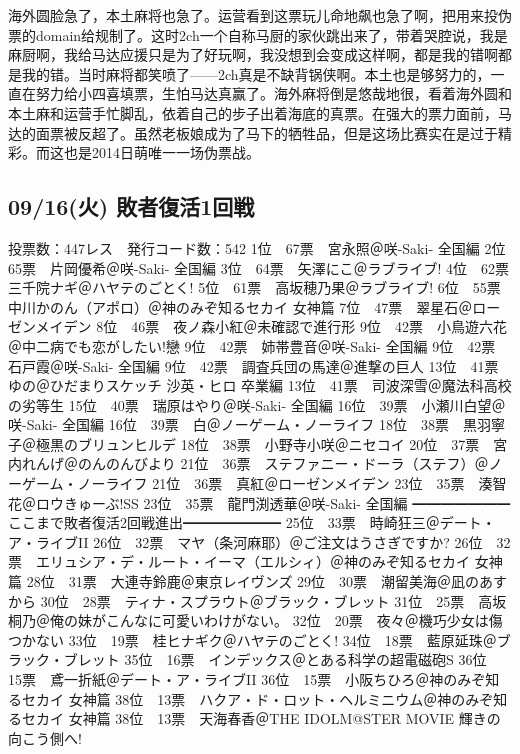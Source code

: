 海外圆脸急了，本土麻将也急了。运营看到这票玩儿命地飙也急了啊，把用来投伪票的domain给规制了。这时2ch一个自称马厨的家伙跳出来了，带着哭腔说，我是麻厨啊，我给马达应援只是为了好玩啊，我没想到会变成这样啊，都是我的错啊都是我的错。当时麻将都笑喷了——2ch真是不缺背锅侠啊。本土也是够努力的，一直在努力给小四喜填票，生怕马达真赢了。海外麻将倒是悠哉地很，看着海外圆和本土麻和运营手忙脚乱，依着自己的步子出着海底的真票。在强大的票力面前，马达的面票被反超了。虽然老板娘成为了马下的牺牲品，但是这场比赛实在是过于精彩。而这也是2014日萌唯一一场伪票战。

\subsection{09/16(火) 敗者復活1回戦}

	投票数：447レス　発行コード数：542
	1位　67票　宮永照＠咲-Saki- 全国編
	2位　65票　片岡優希＠咲-Saki- 全国編
	3位　64票　矢澤にこ＠ラブライブ!
	4位　62票　三千院ナギ＠ハヤテのごとく!
	5位　61票　高坂穂乃果＠ラブライブ!
	6位　55票　中川かのん（アポロ）＠神のみぞ知るセカイ 女神篇
	7位　47票　翠星石＠ローゼンメイデン
	8位　46票　夜ノ森小紅＠未確認で進行形
	9位　42票　小鳥遊六花＠中二病でも恋がしたい!戀
	9位　42票　姉帯豊音＠咲-Saki- 全国編
	9位　42票　石戸霞＠咲-Saki- 全国編
	9位　42票　調査兵団の馬達＠進撃の巨人
	13位　41票　ゆの＠ひだまりスケッチ 沙英・ヒロ 卒業編
	13位　41票　司波深雪＠魔法科高校の劣等生
	15位　40票　瑞原はやり＠咲-Saki- 全国編
	16位　39票　小瀬川白望＠咲-Saki- 全国編
	16位　39票　白＠ノーゲーム・ノーライフ
	18位　38票　黒羽寧子＠極黒のブリュンヒルデ
	18位　38票　小野寺小咲＠ニセコイ
	20位　37票　宮内れんげ＠のんのんびより
	21位　36票　ステファニー・ドーラ（ステフ）＠ノーゲーム・ノーライフ
	21位　36票　真紅＠ローゼンメイデン
	23位　35票　湊智花＠ロウきゅーぶ!SS
	23位　35票　龍門渕透華＠咲-Saki- 全国編
	━━━━━━━ここまで敗者復活2回戦進出━━━━━━━
	25位　33票　時崎狂三＠デート・ア・ライブII
	26位　32票　マヤ（条河麻耶）＠ご注文はうさぎですか?
	26位　32票　エリュシア・デ・ルート・イーマ（エルシィ）＠神のみぞ知るセカイ 女神篇
	28位　31票　大連寺鈴鹿＠東京レイヴンズ
	29位　30票　潮留美海＠凪のあすから
	30位　28票　ティナ・スプラウト＠ブラック・ブレット
	31位　25票　高坂桐乃＠俺の妹がこんなに可愛いわけがない。
	32位　20票　夜々＠機巧少女は傷つかない
	33位　19票　桂ヒナギク＠ハヤテのごとく!
	34位　18票　藍原延珠＠ブラック・ブレット
	35位　16票　インデックス＠とある科学の超電磁砲S
	36位　15票　鳶一折紙＠デート・ア・ライブII
	36位　15票　小阪ちひろ＠神のみぞ知るセカイ 女神篇
	38位　13票　ハクア・ド・ロット・ヘルミニウム＠神のみぞ知るセカイ 女神篇
	38位　13票　天海春香＠THE IDOLM@STER MOVIE 輝きの向こう側へ!

